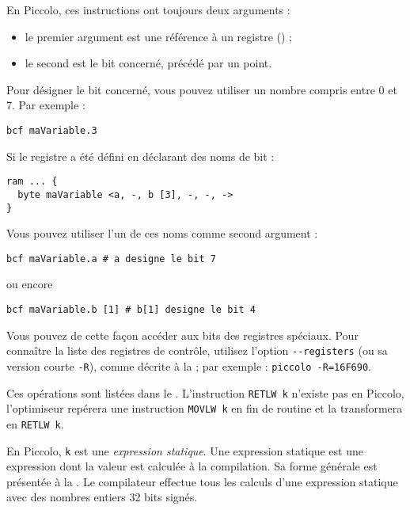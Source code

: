 En Piccolo, ces instructions ont toujours deux arguments :
\begin{itemize}
  \item le premier argument est une référence à un registre () ;
  \item le second est le bit concerné, précédé par un point.
\end{itemize}

Pour désigner le bit concerné, vous pouvez utiliser un nombre compris entre 0 et 7. Par exemple :
\begin{lstlisting}[language=piccolo]
bcf maVariable.3
\end{lstlisting}

Si le registre a été défini en déclarant des noms de bit :
\begin{lstlisting}[language=piccolo]
ram ... {
  byte maVariable <a, -, b [3], -, -, ->
}
\end{lstlisting}

Vous pouvez utiliser l’un de ces noms comme second argument :
\begin{lstlisting}[language=piccolo]
bcf maVariable.a # a designe le bit 7
\end{lstlisting}
ou encore
\begin{lstlisting}[language=piccolo]
bcf maVariable.b [1] # b[1] designe le bit 4
\end{lstlisting}

Vous pouvez de cette façon accéder aux bits des registres spéciaux. Pour connaître la liste des registres de contrôle, utilisez l’option \texttt{-{}-registers} (ou sa version courte \texttt{-R}), comme décrite à la  ; par exemple : \texttt{piccolo -R=16F690}.



Ces opérations sont listées dans le . L’instruction \texttt{RETLW k} n’existe pas en Piccolo, l’optimiseur repérera une instruction \texttt{MOVLW k} en fin de routine et la transformera en \texttt{RETLW k}.

En Piccolo, \texttt{k} est une \emph{expression statique}. Une expression statique est une expression dont la valeur est calculée à la compilation. Sa forme générale est présentée à la . Le compilateur effectue tous les calculs d'une expression statique avec des nombres entiers 32 bits signés.

